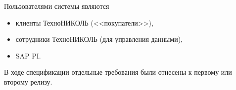
Пользователями системы являются 
\begin{itemize}
\item клиенты ТехноНИКОЛЬ (<<покупатели>>), 
\item сотрудники ТехноНИКОЛЬ (для управления данными),
\item SAP PI.
\end{itemize}


В ходе спецификации отдельные требования были отнесены к первому или второму релизу. 